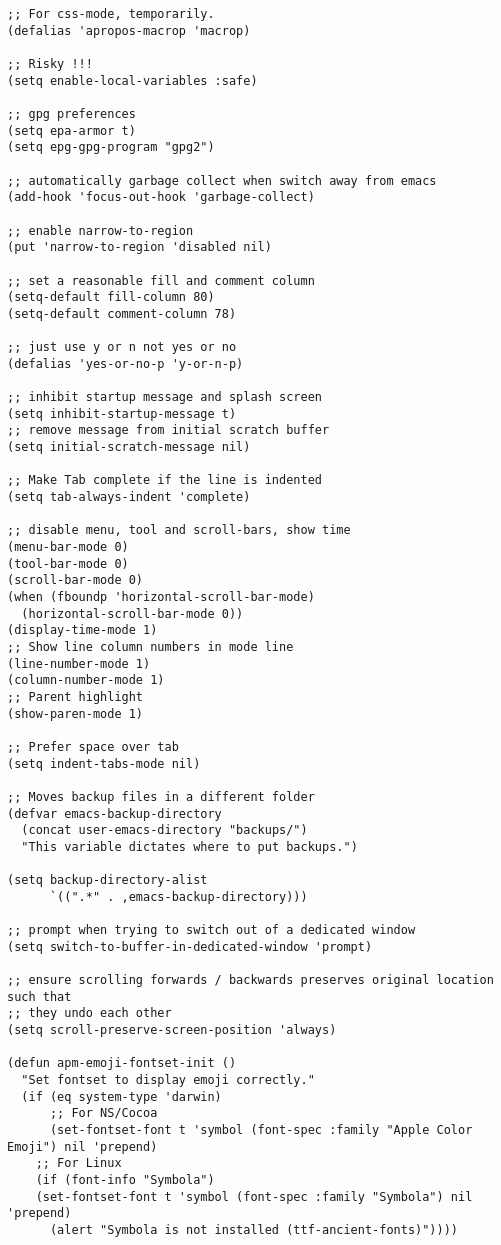 \documentclass[11pt]{article}
\begin{document}
\begin{verbatim}
;; For css-mode, temporarily.
(defalias 'apropos-macrop 'macrop)

;; Risky !!!
(setq enable-local-variables :safe)

;; gpg preferences
(setq epa-armor t)
(setq epg-gpg-program "gpg2")

;; automatically garbage collect when switch away from emacs
(add-hook 'focus-out-hook 'garbage-collect)

;; enable narrow-to-region
(put 'narrow-to-region 'disabled nil)

;; set a reasonable fill and comment column
(setq-default fill-column 80)
(setq-default comment-column 78)

;; just use y or n not yes or no
(defalias 'yes-or-no-p 'y-or-n-p)

;; inhibit startup message and splash screen
(setq inhibit-startup-message t)
;; remove message from initial scratch buffer
(setq initial-scratch-message nil)

;; Make Tab complete if the line is indented
(setq tab-always-indent 'complete)

;; disable menu, tool and scroll-bars, show time
(menu-bar-mode 0)
(tool-bar-mode 0)
(scroll-bar-mode 0)
(when (fboundp 'horizontal-scroll-bar-mode)
  (horizontal-scroll-bar-mode 0))
(display-time-mode 1)
;; Show line column numbers in mode line
(line-number-mode 1)
(column-number-mode 1)
;; Parent highlight
(show-paren-mode 1)

;; Prefer space over tab
(setq indent-tabs-mode nil)

;; Moves backup files in a different folder
(defvar emacs-backup-directory
  (concat user-emacs-directory "backups/")
  "This variable dictates where to put backups.")

(setq backup-directory-alist
      `((".*" . ,emacs-backup-directory)))

;; prompt when trying to switch out of a dedicated window
(setq switch-to-buffer-in-dedicated-window 'prompt)

;; ensure scrolling forwards / backwards preserves original location such that
;; they undo each other
(setq scroll-preserve-screen-position 'always)

(defun apm-emoji-fontset-init ()
  "Set fontset to display emoji correctly."
  (if (eq system-type 'darwin)
      ;; For NS/Cocoa
      (set-fontset-font t 'symbol (font-spec :family "Apple Color Emoji") nil 'prepend)
    ;; For Linux
    (if (font-info "Symbola")
	(set-fontset-font t 'symbol (font-spec :family "Symbola") nil 'prepend)
      (alert "Symbola is not installed (ttf-ancient-fonts)"))))


\end{verbatim}
\end{document}
